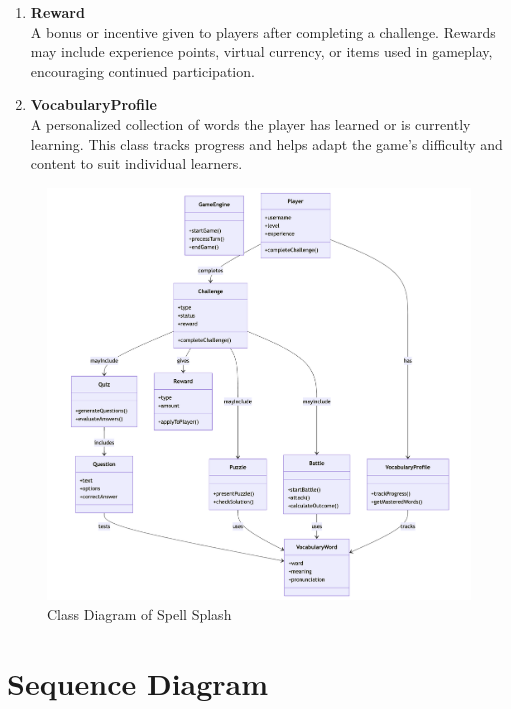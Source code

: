 \begin{enumerate}
    \item \textbf{Reward}\\
    A bonus or incentive given to players after completing a challenge. 
    Rewards may include experience points, virtual currency, or items used in gameplay, encouraging continued participation.

    \item \textbf{VocabularyProfile}\\
    A personalized collection of words the player has learned or is currently learning. 
    This class tracks progress and helps adapt the game’s difficulty and content to suit individual learners.
\end{enumerate}

\clearpage

\begin{figure}[H]
    \centering
    \includegraphics[width=1\textwidth]{assets/ku/class_diagram.png}
    \caption{Class Diagram of Spell Splash}
    \label{fig:design-class-diagram}
\end{figure}

\clearpage

\section{Sequence Diagram}
\label{section:sequence-diagram}

